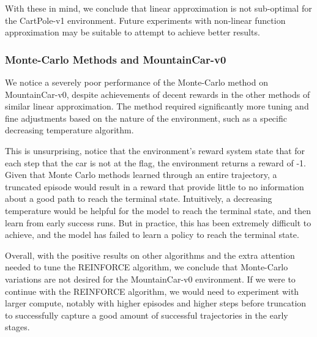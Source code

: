 \documentclass{article in the early stages}
\begin{document}
With these in mind, we conclude that linear approximation is not sub-optimal
for the CartPole-v1 environment. Future experiments with non-linear function approximation
may be suitable to attempt to achieve better results.

\subsubsection{Monte-Carlo Methods and MountainCar-v0}
We notice a severely poor performance of the Monte-Carlo method on MountainCar-v0,
despite achievements of decent rewards in the other methods of similar linear approximation. The method required
significantly more tuning and fine adjustments based on the nature of the environment,
such as a specific decreasing temperature algorithm.

This is unsurprising, notice that the environment's reward system state that
for each step that the car is not at the flag, the environment returns a reward of -1.
Given that Monte Carlo methods learned through an entire trajectory, a truncated
episode would result in a reward that provide little to no information about a good path to
reach the terminal state. Intuitively, a decreasing temperature would be helpful
for the model to reach the terminal state, and then learn from early success runs.
But in practice, this has been extremely difficult to achieve, and the model has failed to learn
a policy to reach the terminal state.

Overall, with the positive results on other algorithms and the extra attention needed to tune the
REINFORCE algorithm, we conclude that Monte-Carlo variations are not desired for the MountainCar-v0 environment.
If we were to continue with the REINFORCE algorithm, we would need to experiment with larger
compute, notably with higher episodes and higher steps before truncation to successfully capture
a good amount of successful trajectories in the early stages.

\newpage
{}

\end{document}
